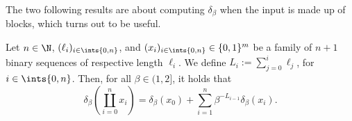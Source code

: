 The two following results are about computing $\delta_\beta$ when the input is made up of blocks, which turns out to be useful. 
\begin{lemma}\label{lem:factorisation of beta expansion through concatenation}
	Let $n \in \N$, $(\ell_i)_{i \in \ints{0,n}}$, and $(x_i)_{i \in \ints{0,n}} \in \{0,1\}^m$ be a family of $n+1$ binary sequences of respective length $\ell_i$. We define $L_i := \sum_{j=0}^i \ell_j$, for $i \in \ints{0,n}$. Then, for all $\beta \in (1,2]$, it holds that
	\begin{equation}
		\delta_\beta\left(\coprod_{i=0}^n x_i \right) = \delta_\beta(x_0) + \sum_{i=1}^n \beta^{-L_{i-1}} \delta_\beta(x_i).
	\end{equation}
\end{lemma}

